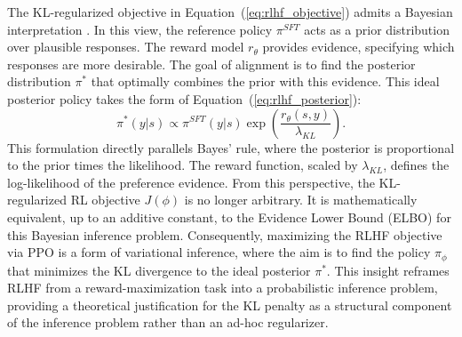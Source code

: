 The KL-regularized objective in Equation~(\ref{eq:rlhf_objective}) admits a Bayesian interpretation \citep{korbak2022rl}. In this view, the reference policy $\pi^{SFT}$ acts as a prior distribution over plausible responses. The reward model $r_\theta$ provides evidence, specifying which responses are more desirable. The goal of alignment is to find the posterior distribution $\pi^*$ that optimally combines the prior with this evidence. This ideal posterior policy takes the form of Equation~(\ref{eq:rlhf_posterior}):
\begin{equation}
    \pi^*(y|s) \propto \pi^{SFT}(y|s) \exp\left(\frac{r_\theta(s, y)}{\lambda_{KL}}\right).
\label{eq:rlhf_posterior}
\end{equation}
This formulation directly parallels Bayes' rule, where the posterior is proportional to the prior times the likelihood. The reward function, scaled by $\lambda_{KL}$, defines the log-likelihood of the preference evidence. From this perspective, the KL-regularized RL objective $J(\phi)$ is no longer arbitrary. It is mathematically equivalent, up to an additive constant, to the Evidence Lower Bound (ELBO) for this Bayesian inference problem. Consequently, maximizing the RLHF objective via PPO is a form of variational inference, where the aim is to find the policy $\pi_\phi$ that minimizes the KL divergence to the ideal posterior $\pi^*$. This insight reframes RLHF from a reward-maximization task into a probabilistic inference problem, providing a theoretical justification for the KL penalty as a structural component of the inference problem rather than an ad-hoc regularizer.


